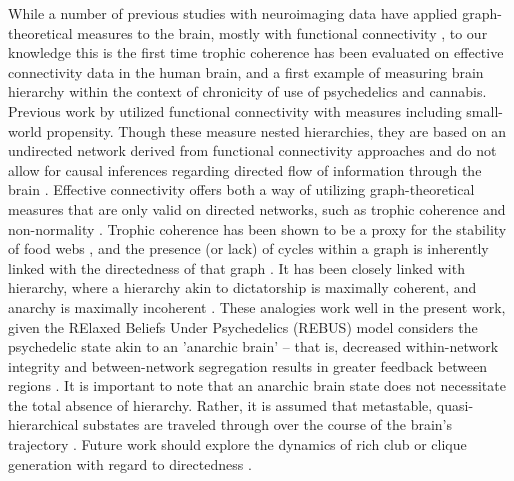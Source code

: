 While a number of previous studies with neuroimaging data have applied graph-theoretical measures to the brain, mostly with functional connectivity \parencite{Sporns2016, Bullmore2009,Goldenberg2015}, to our knowledge this is the first time trophic coherence has been evaluated on effective connectivity data in the human brain, and a first example of measuring brain hierarchy within the context of chronicity of use of psychedelics and cannabis. Previous work by \textcite{Luppi2021} utilized functional connectivity with measures including small-world propensity. Though these measure nested hierarchies, they are based on an undirected network derived from functional connectivity approaches and do not allow for causal inferences regarding directed flow of information through the brain \parencite{Reid2019}. Effective connectivity offers both a way of utilizing graph-theoretical measures that are only valid on directed networks, such as trophic coherence and non-normality \parencite{Pilgrim2020, Asllani2018}. Trophic coherence has been shown to be a proxy for the stability of food webs \parencite{Johnson2014}, and the presence (or lack) of cycles within a graph is inherently linked with the directedness of that graph \textcite{Johnson2017a}. It has been closely linked with hierarchy, where a hierarchy akin to dictatorship is maximally coherent, and anarchy is maximally incoherent \parencite{Pagani2019, Pilgrim2020}. These analogies work well in the present work, given the RElaxed Beliefs Under Psychedelics (REBUS) model considers the psychedelic state akin to an 'anarchic brain' -- that is, decreased within-network integrity and between-network segregation results in greater feedback between regions \parencite{Carhart-Harris2019a}. It is important to note that an anarchic brain state does not necessitate the total absence of hierarchy. Rather, it is assumed that metastable, quasi-hierarchical substates are traveled through over the course of the brain's trajectory \parencite{Pilgrim2020}. Future work should explore the dynamics of rich club or clique generation with regard to directedness \parencite{Dennis2013, Deco2021}.

